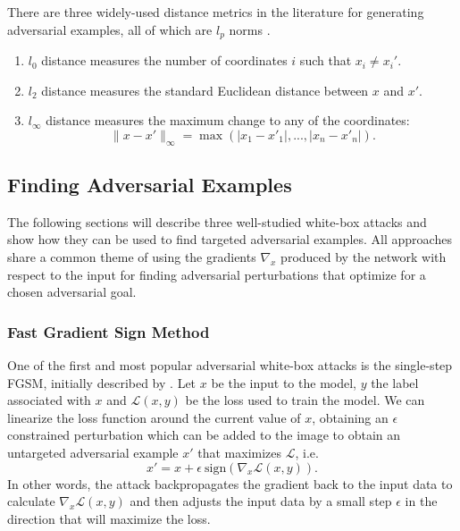 There  are three widely-used distance metrics in the literature for generating adversarial examples, all of which are $l_p$ norms \parencite{carlini2017towards}.

\begin{enumerate}
	\item $l_0$ distance measures the number of coordinates $i$ such that $x_i \ne x_i' $.
	\item $l_2$ distance measures the standard Euclidean distance between $x$ and $x'$. 
	\item $l_\infty$ distance measures the maximum change to any of the coordinates:
	\begin{equation}
		\|x-x'\|_\infty = \max(|x_1-x'_1|,...,|x_n-x'_n|).
	\end{equation}
\end{enumerate}

\subsection{Finding Adversarial Examples}
The following sections will describe three well-studied white-box attacks and show how they can be used to find targeted adversarial examples. All approaches share a common theme of using the gradients $\nabla_x$ produced by the network with respect to the input for finding adversarial perturbations that optimize for a chosen adversarial goal.

\subsubsection{Fast Gradient Sign Method}
One of the first and most popular adversarial white-box attacks is the single-step \ac{FGSM}, initially described by \cite{goodfellow2014explaining}. Let $x$ be the input to the model, $y$ the label associated with $x$ and $\mathcal{L}(x, y)$ be the loss used to train the model. We can linearize the loss function around the current value of $x$, obtaining an $\epsilon$ constrained perturbation which can be added to the image to obtain an untargeted adversarial example $x'$ that maximizes $\mathcal{L}$, i.e.
\begin{equation}
x' = x + \epsilon\ \text{sign}(\nabla_x\mathcal{L}(x, y)).
\label{eq:fgsm-untargeted}
\end{equation}
In other words, the attack backpropagates the gradient back to the input data to calculate $\nabla_x\mathcal{L}(x, y)$ and then adjusts the input data by a small step $\epsilon$ in the direction that will maximize the loss. 

